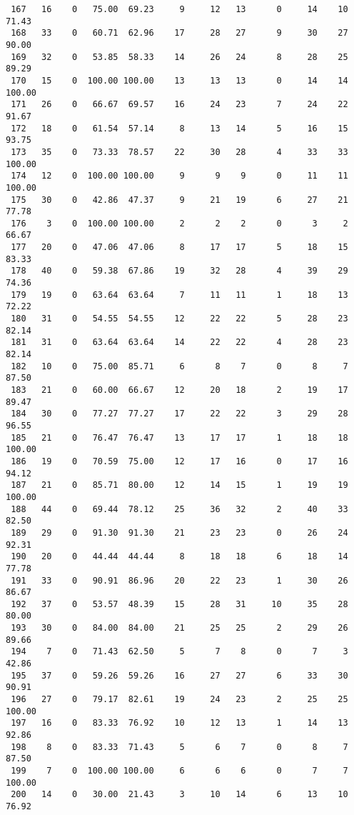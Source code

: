 \begin{verbatim}
 167   16    0   75.00  69.23     9     12   13      0     14    10    71.43
 168   33    0   60.71  62.96    17     28   27      9     30    27    90.00
 169   32    0   53.85  58.33    14     26   24      8     28    25    89.29
 170   15    0  100.00 100.00    13     13   13      0     14    14   100.00
 171   26    0   66.67  69.57    16     24   23      7     24    22    91.67
 172   18    0   61.54  57.14     8     13   14      5     16    15    93.75
 173   35    0   73.33  78.57    22     30   28      4     33    33   100.00
 174   12    0  100.00 100.00     9      9    9      0     11    11   100.00
 175   30    0   42.86  47.37     9     21   19      6     27    21    77.78
 176    3    0  100.00 100.00     2      2    2      0      3     2    66.67
 177   20    0   47.06  47.06     8     17   17      5     18    15    83.33
 178   40    0   59.38  67.86    19     32   28      4     39    29    74.36
 179   19    0   63.64  63.64     7     11   11      1     18    13    72.22
 180   31    0   54.55  54.55    12     22   22      5     28    23    82.14
 181   31    0   63.64  63.64    14     22   22      4     28    23    82.14
 182   10    0   75.00  85.71     6      8    7      0      8     7    87.50
 183   21    0   60.00  66.67    12     20   18      2     19    17    89.47
 184   30    0   77.27  77.27    17     22   22      3     29    28    96.55
 185   21    0   76.47  76.47    13     17   17      1     18    18   100.00
 186   19    0   70.59  75.00    12     17   16      0     17    16    94.12
 187   21    0   85.71  80.00    12     14   15      1     19    19   100.00
 188   44    0   69.44  78.12    25     36   32      2     40    33    82.50
 189   29    0   91.30  91.30    21     23   23      0     26    24    92.31
 190   20    0   44.44  44.44     8     18   18      6     18    14    77.78
 191   33    0   90.91  86.96    20     22   23      1     30    26    86.67
 192   37    0   53.57  48.39    15     28   31     10     35    28    80.00
 193   30    0   84.00  84.00    21     25   25      2     29    26    89.66
 194    7    0   71.43  62.50     5      7    8      0      7     3    42.86
 195   37    0   59.26  59.26    16     27   27      6     33    30    90.91
 196   27    0   79.17  82.61    19     24   23      2     25    25   100.00
 197   16    0   83.33  76.92    10     12   13      1     14    13    92.86
 198    8    0   83.33  71.43     5      6    7      0      8     7    87.50
 199    7    0  100.00 100.00     6      6    6      0      7     7   100.00
 200   14    0   30.00  21.43     3     10   14      6     13    10    76.92

\end{verbatim}
